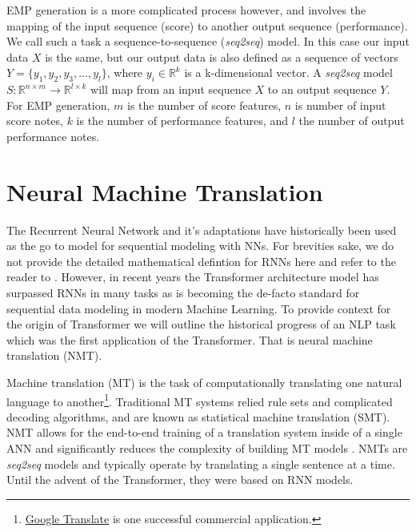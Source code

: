 \newcommand{\seq}{\emph{seq2seq}}

EMP generation is a more complicated process however, and involves the mapping of the input sequence (score) to another output sequence (performance). We call such a task a sequence-to-sequence (\seq{}) model. In this case our input data $X$ is the same, but our output data is also defined as a sequence of vectors $Y = \{y_1, y_2, y_3, ..., y_l\}$, where $y_i \in \mathbb{R}^k$ is a k-dimensional vector. A \seq{} model $S: \mathbb{R}^{n \times m} \rightarrow \mathbb{R}^{l \times k}$ will map from an input sequence $X$ to an output sequence $Y$. For EMP generation, $m$ is the number of score features, $n$ is number of input score notes, $k$ is the number of performance features, and $l$ the number of output performance notes. 

\section{Neural Machine Translation}
The Recurrent Neural Network and it's adaptations have historically been used as the go to model for sequential modeling with NNs. For brevities sake, we do not provide the detailed mathematical defintion for RNNs here and refer to the reader to \cite{goodfellow2016deep}. However, in recent years the Transformer\cite{vaswani2017attention} architecture model has surpassed RNNs in many tasks as is becoming the de-facto standard for sequential data modeling in modern Machine Learning. To provide context for the origin of Transformer we will outline the historical progress of an NLP task which was the first application of the Transformer. That is neural machine translation (NMT). 

Machine translation (MT) is the task of computationally translating one natural language to another\footnote{\href{https://translate.google.com/}{Google Translate} is one successful commercial application.}. Traditional MT systems relied rule sets and complicated decoding algorithms, and are known as statistical machine translation (SMT). NMT allows for the end-to-end training of a translation system inside of a single ANN and significantly reduces the complexity of building MT models \cite{chu2018survey}. NMTs are \seq{} models and typically operate by translating a single sentence at a time. Until the advent of the Transformer, they were based on RNN models. 

\newcommand{\ed}{\emph{encoder-decoder}}

